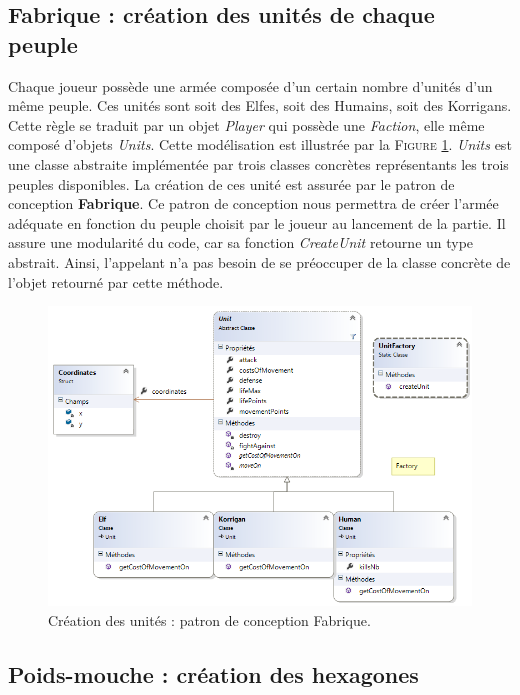 	\subsection{Fabrique : création des unités de chaque peuple}
		
		Chaque joueur possède une armée composée d'un certain nombre d'unités d'un même peuple. Ces unités sont soit des Elfes, soit des Humains, soit des Korrigans. Cette règle se traduit par un objet \emph{Player} qui possède une \emph{Faction}, elle même composé d'objets \emph{Units}. Cette modélisation est illustrée par la \textsc{Figure} \ref{fig:factory}. \emph{Units} est une classe abstraite implémentée par trois classes concrètes représentants les trois peuples disponibles. La création de ces unité est assurée par le patron de conception \textbf{Fabrique}. Ce patron de conception nous permettra de créer l'armée adéquate en fonction du peuple choisit par le joueur au lancement de la partie. Il assure une modularité du code, car sa fonction \emph{CreateUnit} retourne un type abstrait. Ainsi, l'appelant n'a pas besoin de se préoccuper de la classe concrète de l'objet retourné par cette méthode. 
		
		\begin{figure}[h]
			\begin{center}
				\includegraphics[width=1\textwidth]{figure/factory.png}
			\end{center}
			\caption{Création des unités : patron de conception Fabrique.}
			\label{fig:factory}
		\end{figure}


	\subsection{Poids-mouche : création des hexagones}

